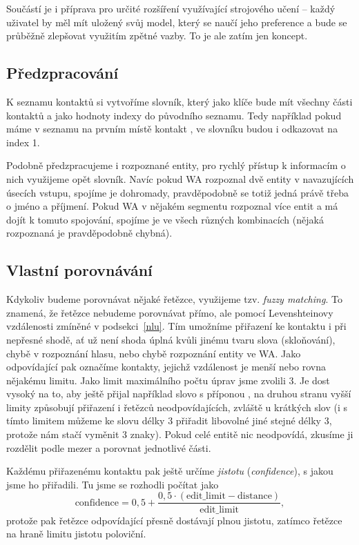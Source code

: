 Součástí je i příprava pro určité rozšíření využívající strojového učení -- každý
uživatel by měl mít uložený svůj model, který se naučí jeho preference a bude se
průběžně zlepšovat využitím zpětné vazby. To je ale zatím jen koncept.

\subsection{Předzpracování}

K seznamu kontaktů si vytvoříme slovník,
který jako klíče bude mít všechny části kontaktů a jako hodnoty indexy do původního
seznamu. Tedy například pokud máme v seznamu na prvním místě kontakt ,
ve slovníku budou  i  odkazovat na index 1.

Podobně předzpracujeme i rozpoznané entity, pro rychlý přístup k informacím o nich
využijeme opět slovník. Navíc pokud WA rozpoznal dvě entity v navazujících úsecích vstupu,
spojíme je dohromady, pravděpodobně se totiž jedná právě třeba o jméno a příjmení.
Pokud WA v nějakém segmentu rozpoznal více entit a má dojít k tomuto spojování, spojíme
je ve všech různých kombinacích (nějaká rozpoznaná je pravděpodobně chybná).

\subsection{Vlastní porovnávání}

Kdykoliv budeme porovnávat nějaké řetězce, využijeme tzv. \textit{fuzzy matching}.
To znamená, že řetězce nebudeme porovnávat přímo, ale pomocí Levenshteinovy vzdálenosti
zmíněné v podsekci~\ref{nlu}. Tím umožníme přiřazení ke kontaktu i při nepřesné shodě,
ať už není shoda úplná kvůli jinému tvaru slova (skloňování), chybě v rozpoznání
hlasu, nebo chybě rozpoznání entity ve WA. Jako odpovídající pak označíme kontakty,
jejichž vzdálenost je menší nebo rovna nějakému limitu. Jako limit maximálního počtu
úprav jsme zvolili 3. Je dost vysoký na to, aby ještě přijal například slovo s příponou
, na druhou stranu vyšší limity způsobují přiřazení i řetězců neodpovídajících,
zvláště u krátkých slov (i s tímto limitem můžeme ke slovu délky 3 přiřadit libovolné jiné
stejné délky 3, protože nám stačí vyměnit 3 znaky). Pokud celé entitě nic neodpovídá,
zkusíme ji rozdělit podle mezer a porovnat jednotlivé části.

Každému přiřazenému kontaktu pak ještě určíme \textit{jistotu} (\textit{confidence}),
s jakou jsme ho přiřadili. Tu jsme se rozhodli počítat jako
\[ \text{confidence} = 0,5 + \frac{0,5 \cdot (\text{edit\_limit} - \text{distance})}{\text{edit\_limit}} ,\]
protože pak řetězce odpovídající přesně dostávají plnou jistotu, zatímco řetězce na
hraně limitu jistotu poloviční.

